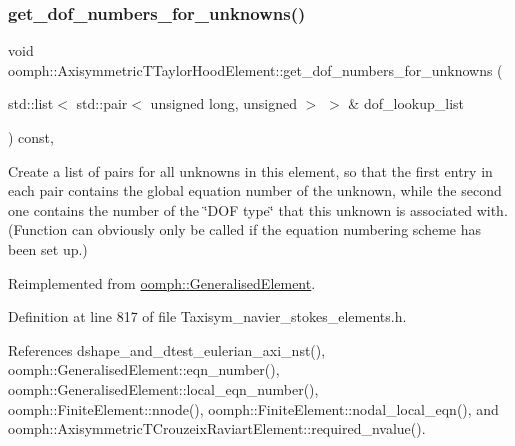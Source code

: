 \mbox{\label{classoomph_1_1AxisymmetricTTaylorHoodElement_a3f1f37c74e194ae5770d9928c9a0e409}} 
\subsubsection{\texorpdfstring{get\+\_\+dof\+\_\+numbers\+\_\+for\+\_\+unknowns()}{get\_dof\_numbers\_for\_unknowns()}}
{\footnotesize\ttfamily void oomph\+::\+Axisymmetric\+T\+Taylor\+Hood\+Element\+::get\+\_\+dof\+\_\+numbers\+\_\+for\+\_\+unknowns (\begin{DoxyParamCaption}\item[{std\+::list$<$ std\+::pair$<$ unsigned long, unsigned $>$ $>$ \&}]{dof\+\_\+lookup\+\_\+list }\end{DoxyParamCaption}) const\hspace{0.3cm}{\ttfamily [inline]}, {\ttfamily [virtual]}}



Create a list of pairs for all unknowns in this element, so that the first entry in each pair contains the global equation number of the unknown, while the second one contains the number of the \char`\"{}\+D\+O\+F type\char`\"{} that this unknown is associated with. (Function can obviously only be called if the equation numbering scheme has been set up.) 



Reimplemented from \hyperlink{classoomph_1_1GeneralisedElement_a069f59bfc3e607a5bebba52c6314d777}{oomph\+::\+Generalised\+Element}.



Definition at line 817 of file Taxisym\+\_\+navier\+\_\+stokes\+\_\+elements.\+h.



References dshape\+\_\+and\+\_\+dtest\+\_\+eulerian\+\_\+axi\+\_\+nst(), oomph\+::\+Generalised\+Element\+::eqn\+\_\+number(), oomph\+::\+Generalised\+Element\+::local\+\_\+eqn\+\_\+number(), oomph\+::\+Finite\+Element\+::nnode(), oomph\+::\+Finite\+Element\+::nodal\+\_\+local\+\_\+eqn(), and oomph\+::\+Axisymmetric\+T\+Crouzeix\+Raviart\+Element\+::required\+\_\+nvalue().

